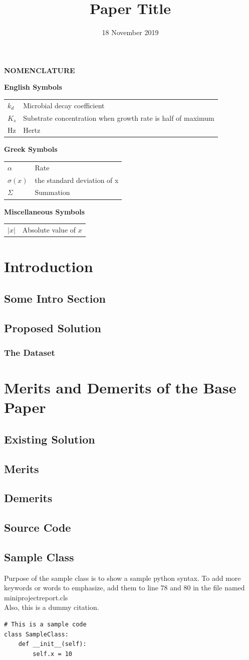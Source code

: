 \documentclass{projectreport}
\title{Paper Title}
\date{18 November 2019}
\newcommand{\nomenclature}{
	\begin{center}
		\Large \textbf{NOMENCLATURE}\\
	\end{center}
	\begin{table}[h]
	\Large \textbf{English Symbols}\\
	\begin{tabular}{ll}
	$k_d$&Microbial decay coefficient\\
	$K_s$&Substrate concentration when growth rate is half of maximum\\
	Hz&Hertz\\
	\end{tabular}
	\end{table}
	\begin{table}[h]
	\Large \textbf{Greek Symbols}\\
	\begin{tabular}{ll}
	$\alpha$&Rate\\
	$\sigma(x)$&the standard deviation of x\\
	$\Sigma$&Summation\\
	\end{tabular}
	\end{table}
	\begin{table}[h]
	\Large \textbf{Miscellaneous Symbols}\\
	\begin{tabular}{ll}
	$|x|$&Absolute value of $x$\\
	\end{tabular}
	\end{table}
}
\begin{document}
	\makereportfirstpage
	\bonafide
	\declaration
	\acknowledgement{\lipsum[1]}
	\newpage
	\tableofcontents
	\newpage
	\listoffigures
	\newpage
	\listoftables
	\newpage
	\nomenclature
	\newpage
	\newpage
	\newpage
	\setcounter{page}{1}
	\chapter{Introduction}
		\setcounter{chapter}{1}
		\section{Some Intro Section}
		\lipsum[3]
		\section{Proposed Solution}
		\lipsum[4]
		\subsection{The Dataset}
		\lipsum[5]
	\chapter{Merits and Demerits of the Base Paper}
		\section{Existing Solution}
		\lipsum[6]
		\section{Merits}
		\lipsum[7]
		\section{Demerits}
		\lipsum[8]
	\begin{hyphenatedcode}
	\chapter{Source Code}
	\section{Sample Class}
	Purpose of the sample class is to show a sample python syntax. To add more keywords or words to emphasize, add them to line 78 and 80 in the file named miniprojectreport.cls\\Also, this\cite{7457930} is a dummy citation.\\
\begin{lstlisting}
# This is a sample code
class SampleClass:
    def __init__(self):
        self.x = 10	
\end{lstlisting}
	\end{hyphenatedcode}
	\newpage
\end{document}
